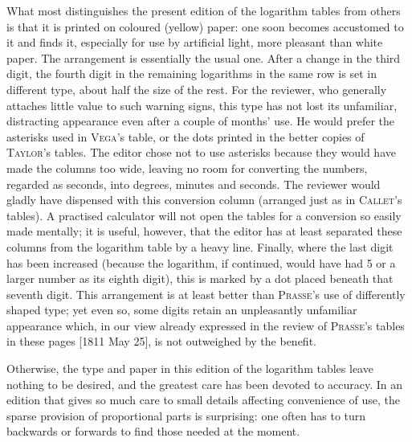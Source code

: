 What most distinguishes the present edition of the logarithm tables from others is that it is printed on coloured (yellow) paper: one soon becomes accustomed to it and finds it, especially for use by artificial light, more  pleasant than white paper. The arrangement is essentially the usual one. After a change in the third digit, the fourth digit in the remaining logarithms in the same row is set in different type, about half the size of the rest. For the reviewer, who generally attaches little value to such warning signs, this type has not lost its unfamiliar, distracting appearance even after a couple of months' use. He would prefer the asterisks used in \textsc{Vega}’s table, or the dots printed in the better copies of \textsc{Taylor}’s tables. The editor chose not to use asterisks because they would have made the columns too wide, leaving no room for converting the numbers, regarded as seconds, into degrees, minutes and seconds. The reviewer would gladly have dispensed with this conversion column (arranged just as in \textsc{Callet}’s tables). A practised calculator will not open the tables for a conversion so easily made mentally; it is useful, however, that the editor has at least separated these columns from the logarithm table by a heavy line. Finally, where the last digit has been increased (because the logarithm, if continued, would have had 5 or a larger number as its eighth digit), this is marked by a dot placed beneath that seventh digit. This arrangement is at least better than \textsc{Prasse}'s use of differently shaped type; yet even so, some digits retain an unpleasantly unfamiliar appearance which, in our view already expressed in the review of \textsc{Prasse}’s tables in these pages [1811 May 25], is not outweighed by the benefit.

Otherwise, the type and paper in this edition of the logarithm tables leave nothing to be desired, and the greatest care has been devoted to accuracy. In an edition that gives so much care to small details affecting convenience of use, the sparse provision of proportional parts is surprising: one often has to turn backwards or forwards to find those needed at the moment.
